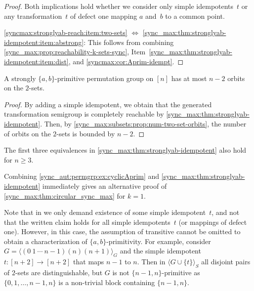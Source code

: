 \begin{proof}
Both implications hold whether we consider only simple idempotents~$t$
or any transformation~$t$ of defect one mapping $a$ and~$b$
to a common point.

\ref{syncmax:stronglyab-reach:item:two-sets} $\Leftrightarrow$ \ref{sync_max:thm:stronglyab-idempotent:item:abstrong}:
This follows from combining
\cref{sync_max:prop:reachability-k-sets-sync},
Item~\ref{sync_max:thm:stronglyab-idempotent:item:dist},
and \cref{syncmax:cor:Aprim-idempt}.
\end{proof}

\begin{corollary}
	A strongly $\{a,b\}$-primitive permutation group on $[n]$
	has at most $n - 2$ orbits on the $2$-sets.	
\end{corollary}
\begin{proof}
	By adding a simple idempotent,
	we obtain that the generated transformation semigroup
	is completely reachable by \cref{sync_max:thm:stronglyab-idempotent}.
	Then, by \cref{sync_max:subsets:prop:num-two-set-orbits},
	the number of orbits on the $2$-sets is bounded by $n - 2$.
\end{proof} 

\begin{remark}
	The first three equivalences in \cref{sync_max:thm:stronglyab-idempotent}
	also hold for $n \ge 3$.
\end{remark}

\begin{remark}
	Combining \cref{sync_aut:permgrp:ex:cyclicAprim}
	and \cref{sync_max:thm:stronglyab-idempotent}
	immediately gives an alternative proof of \cref{sync_max:thm:circular_sync_max}
	for $k = 1$.
\end{remark}

\begin{remark}
	Note that in 
	we only demand existence of some simple idempotent~$t$,
	and not that the written claim holds for all simple idempotents~$t$ (or mappings of defect one).
	However, in this case, the assumption of transitive cannot be omitted
    to obtain a characterization of $\{a,b\}$-primitivity.
	For example, consider $G = \langle (0 ~ 1 ~ \cdots ~ n - 1)(n)(n+1) \rangle_G$
	and the simple idempotent $t \colon [n+2] \to [n+2]$
	that maps $n-1$ to $n$. 
	Then in $\langle G \cup \{t\} \rangle_S$
	all disjoint pairs of $2$-sets are distinguishable,
	but $G$ is not $\{n-1,n\}$-primitive as $\{0,1,\ldots,n-1,n\}$ is a non-trivial block containing $\{n-1,n\}$.
\end{remark}

